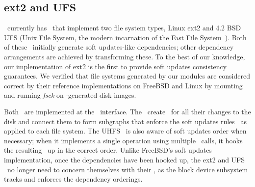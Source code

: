 \begin{comment}
An example configuration taking advantage of this ability could be a file
system image mounted with an external journal, both of which are loopback block
devices stored on the root file system (which could use soft updates). The
journaled file system's ordering requirements are sent through the loopback
device as \patches, allowing dependency information to be maintained across
boundaries that might otherwise lose that information. In contrast, without
\patches\ and the ability to forward \patches\ through loopback devices, BSD
cannot express soft updates' consistency requirements through loopback devices.
Although the use of a loopback device is somewhat contrived in the example,
they are increasingly being used in conventional operating systems. For
instance, Mac OS X uses them in order to allow users to encrypt their home
directories.
\end{comment}

\subsection{ext2 and UFS}

\Kudos\ currently has \modules\ that implement two file system types, Linux
ext2 and 4.2 BSD UFS (Unix File System, the modern incarnation of the Fast File
System~\cite{mckusick84fast}).
%
Both of these \modules\ initially generate soft updates-like dependencies; other
dependency arrangements are achieved by transforming these.
%
%
To the best of our knowledge, our implementation of ext2 is the first to provide
soft updates consistency guarantees.
%
%
%
We verified that file systems generated by our modules are considered
correct by their reference implementations on FreeBSD and Linux by mounting
and running \emph{fsck} on \Kudos-generated disk images.

Both \modules\ are implemented at the \LFS\ interface. 
%
%
The \modules\ create \patches\ for all their changes to the disk and
connect them to form subgraphs that enforce the soft updates
rules~\cite{ganger00soft} as applied to each file system. 
%
The UHFS \module\ is also aware of soft updates order when necessary; when
it implements a single operation using multiple \LFS\ calls, it hooks the
resulting \patches\ up in the correct order.
%
Unlike FreeBSD's soft updates implementation, once the dependencies have
been hooked up, the ext2 and UFS \modules\ no longer need to concern
themselves with their \patches, as the block device subsystem tracks and
enforces the dependency orderings.

